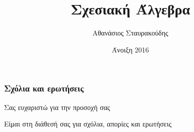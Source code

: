 \documentclass[xcolor=dvipsnames, aspectratio=149, 12pt]{beamer}
\begin{document}
\el
\author[]{Αθανάσιος Σταυρακούδης}
\title[]{Σχεσιακή Άλγεβρα}
\date[]{Άνοιξη 2016}

\maketitle















\el
\begin{frame}
\frametitle{Σχόλια και ερωτήσεις}
 \par {\Large \color{red} Σας ευχαριστώ για την προσοχή σας }
 \vspace{1cm}
 \par Είμαι στη διάθεσή σας για σχόλια, απορίες και ερωτήσεις
\end{frame}
\end{document}
